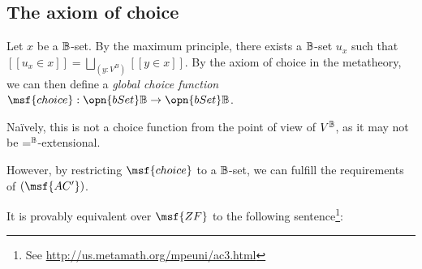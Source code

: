 \documentclass[11pt]{article}
\begin{document}
\subsection{The axiom of choice}

Let $x$ be a $\mathbb{B}$-set. By the maximum principle, there exists a $\mathbb{B}$-set $u_x$ such that
$[[u_x \in x]] = \bigsqcup_{(y : V^B)} [[y \in x]]$. By the axiom of choice in the metatheory, we can then define a \emph{global choice function} $\msf{choice} : \opn{bSet} \B \to \opn{bSet} \B$.

Na\"ively, this is not a choice function from the point of view of $V^{\mathbb{B}}$, as it may not be $=^{\mathbb{B}}$-extensional.

However, by restricting $\msf{choice}$ to a $\mathbb{B}$-set, we can fulfill the requirements of $(\msf{AC'})$.



It is provably equivalent over $\msf{ZF}$ to the following sentence\footnote{See \url{http://us.metamath.org/mpeuni/ac3.html}}:

\end{document}
